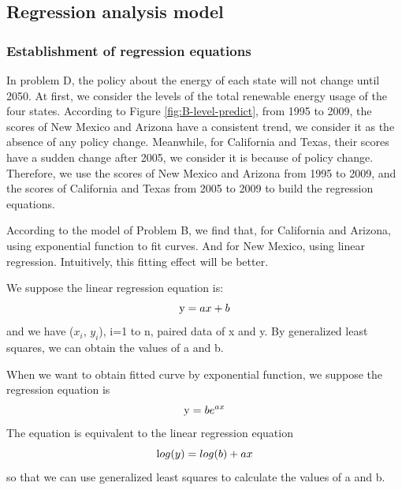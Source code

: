 \documentclass[a4paper,11pt]{article}
\begin{document}
\subsection{Regression analysis model}  
\subsubsection{Establishment of regression equations}
\par In problem D, the policy about the energy of each state will not change until 2050. At first, we consider the levels of the total renewable energy usage of the four states.  According to Figure \ref{fig:B-level-predict}, from 1995 to 2009, the scores of New Mexico and Arizona have a consistent trend, we consider it as the absence of any policy change. Meanwhile, for California and Texas, their scores have a sudden change after 2005, we consider it is because of policy change. Therefore, we use the scores of New Mexico and Arizona from 1995 to 2009, and the scores of California and Texas from 2005 to 2009 to build the regression equations.

\par According to the model of Problem B, we find that, for California and Arizona, using exponential function to fit curves. And for New Mexico, using linear regression. Intuitively, this fitting effect will be better.

\par We suppose the linear regression equation is:
\begin{equation}
    \centering
\text   y=ax+b
\end{equation}
and we have ($x_i$, $y_i$), i=1 to n, paired data of x and y. By generalized least squares, we can obtain the values of a and b.
\par When we want to obtain fitted curve by exponential function, we suppose the regression equation is
\begin{equation}
    \centering
\text   y=be^{ax}
\end{equation}
The equation is equivalent to the linear regression equation
\begin{equation}
    \centering
\text   log(y)=log(b)+ax
\end{equation}
 so that we can use generalized least squares to calculate the values of a and b.
\end{document}
